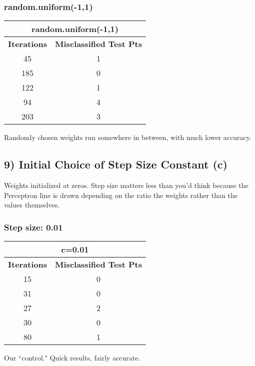 \documentclass{article}
\begin{document}
\subsubsection*{random.uniform(-1,1)}
\begin{center}
\begin{tabular}{|c|c|}
	\hline
	\multicolumn{2}{|c|}{\textbf{random.uniform(-1,1)}} \\\hline
	\textbf{Iterations} & \textbf{Misclassified Test Pts} \\\hline
	45 & 1 \\
	185 & 0\\
	122 & 1 \\
	94 & 4\\
	203 & 3\\
	\hline
\end{tabular}
\end{center}
Randomly chosen weights run somewhere in between, with much lower accuracy. \\

\newpage
\subsection*{9) Initial Choice of Step Size Constant (c)}
Weights initialized at zeros. Step size matters less than you'd think because the Perceptron line is drawn 
depending on the ratio the weights rather than the values themselves.


\subsubsection*{Step size: 0.01}
\begin{center}
\begin{tabular}{|c|c|}
	\hline
	\multicolumn{2}{|c|}{\textbf{c=0.01}} \\\hline
	\textbf{Iterations} & \textbf{Misclassified Test Pts} \\\hline
	15 & 0 \\
	31 & 0\\
	27 & 2 \\
	30 & 0\\
	80 & 1\\
	\hline
\end{tabular}
\end{center}
Our ``control." Quick results, fairly accurate.
\end{document}
